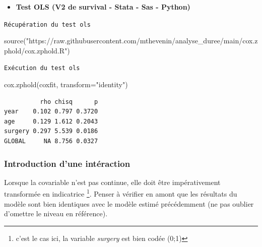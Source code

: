 \documentclass[
  12pt,
  letterpaper,
  DIV=11,
  numbers=noendperiod,
  onepage,
  openany]{scrreprt}
\newenvironment{Shaded}{\begin{snugshade}}{\end{snugshade}}
\newcommand{\AttributeTok}[1]{\textcolor[rgb]{0.80,0.80,0.80}{#1}}
\newcommand{\FunctionTok}[1]{\textcolor[rgb]{0.94,0.94,0.56}{#1}}
\newcommand{\NormalTok}[1]{\textcolor[rgb]{0.80,0.80,0.80}{#1}}
\newcommand{\StringTok}[1]{\textcolor[rgb]{0.80,0.58,0.58}{#1}}
\providecommand{\tightlist}{%
  \setlength{\itemsep}{0pt}\setlength{\parskip}{0pt}}\usepackage{longtable,booktabs,array}
\begin{document}
\begin{itemize}
\tightlist
\item
  \textbf{Test OLS (V2 de survival - Stata - Sas - Python)}
\end{itemize}

\begin{codelisting}

\caption{\texttt{Récupération du test ols}}

\begin{Shaded}
\begin{Highlighting}[]
\FunctionTok{source}\NormalTok{(}\StringTok{"https://raw.githubusercontent.com/mthevenin/analyse\_duree/main/cox.zphold/cox.zphold.R"}\NormalTok{)}
\end{Highlighting}
\end{Shaded}

\end{codelisting}

\begin{codelisting}

\caption{\texttt{Exécution du test ols}}

\begin{Shaded}
\begin{Highlighting}[]
\FunctionTok{cox.zphold}\NormalTok{(coxfit, }\AttributeTok{transform=}\StringTok{"identity"}\NormalTok{)}
\end{Highlighting}
\end{Shaded}

\end{codelisting}

\begin{verbatim}
          rho chisq      p
year    0.102 0.797 0.3720
age     0.129 1.612 0.2043
surgery 0.297 5.539 0.0186
GLOBAL     NA 8.756 0.0327
\end{verbatim}

\hypertarget{introduction-dune-intuxe9raction}{%
\subsubsection{Introduction d'une
intéraction}\label{introduction-dune-intuxe9raction}}

Lorsque la covariable n'est pas continue, elle doit être impérativement
transformée en indicatrice \footnote{c'est le cas ici, la variable
  \emph{surgery} est bien codée (0;1)}. Penser à vérifier en amont que
les résultats du modèle sont bien identiques avec le modèle estimé
précédemment (ne pas oublier d'omettre le niveau en référence).
\end{document}
